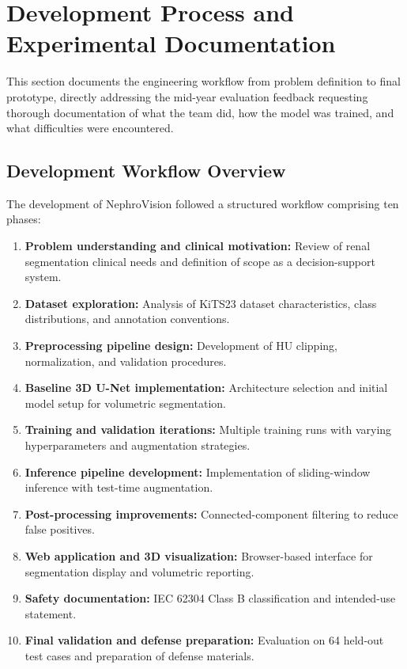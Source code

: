 \section{Development Process and Experimental Documentation}

This section documents the engineering workflow from problem definition to final prototype, directly addressing the mid-year evaluation feedback requesting thorough documentation of what the team did, how the model was trained, and what difficulties were encountered.

\subsection{Development Workflow Overview}

The development of NephroVision followed a structured workflow comprising ten phases:

\begin{enumerate}
    \item \textbf{Problem understanding and clinical motivation:} Review of renal segmentation clinical needs and definition of scope as a decision-support system.
    \item \textbf{Dataset exploration:} Analysis of KiTS23 dataset characteristics, class distributions, and annotation conventions.
    \item \textbf{Preprocessing pipeline design:} Development of HU clipping, normalization, and validation procedures.
    \item \textbf{Baseline 3D U-Net implementation:} Architecture selection and initial model setup for volumetric segmentation.
    \item \textbf{Training and validation iterations:} Multiple training runs with varying hyperparameters and augmentation strategies.
    \item \textbf{Inference pipeline development:} Implementation of sliding-window inference with test-time augmentation.
    \item \textbf{Post-processing improvements:} Connected-component filtering to reduce false positives.
    \item \textbf{Web application and 3D visualization:} Browser-based interface for segmentation display and volumetric reporting.
    \item \textbf{Safety documentation:} IEC 62304 Class B classification and intended-use statement.
    \item \textbf{Final validation and defense preparation:} Evaluation on 64 held-out test cases and preparation of defense materials.
\end{enumerate}

